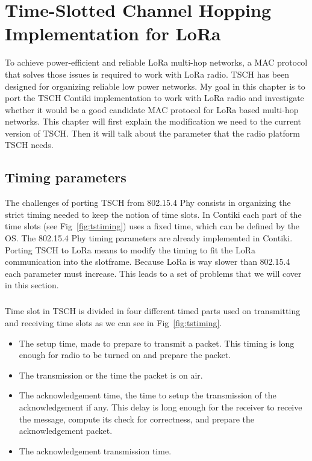 \chapter{Time-Slotted Channel Hopping Implementation for LoRa\label{section:tsch}}

To achieve power-efficient and reliable LoRa multi-hop networks, a MAC protocol
that solves those issues is required to work with LoRa radio.
TSCH has been designed for organizing reliable low power networks.
My goal in this chapter is to port the TSCH Contiki implementation to
work with LoRa radio and investigate whether it would be a good candidate MAC
protocol for LoRa based multi-hop networks.
This chapter will first explain the modification we need to the current version
of TSCH. Then it will talk about the parameter that the radio platform TSCH needs.

\section{Timing parameters\label{section:timingparameters}}

The challenges of porting TSCH from 802.15.4 Phy consists in organizing
the strict timing needed to keep the notion of time slots.
In Contiki each part of the time slots (see Fig~\ref{fig:tstiming}) uses a fixed
time, which can be defined by the OS.
The 802.15.4 Phy timing parameters are already implemented in Contiki.
Porting TSCH to LoRa means to modify the timing to fit the LoRa communication
into the slotframe.
Because LoRa is way slower than 802.15.4 each parameter must increase.
This leads to a set of problems that we will cover in this section.

\paragraph{}

Time slot in TSCH is divided in four different timed parts used on
transmitting and receiving time slots as we can see in Fig~\ref{fig:tstiming}.

\begin{itemize}
  \item The setup time, made to prepare to transmit a packet.
    This timing is long enough for radio to be turned on and prepare the packet.
  \item The transmission or the time the packet is on air.
  \item The acknowledgement time, the time to setup the transmission of the
    acknowledgement if any.
    This delay is long enough for the receiver to receive the message,
    compute its check for correctness, and prepare the acknowledgement packet.
  \item The acknowledgement transmission time.
\end{itemize}

